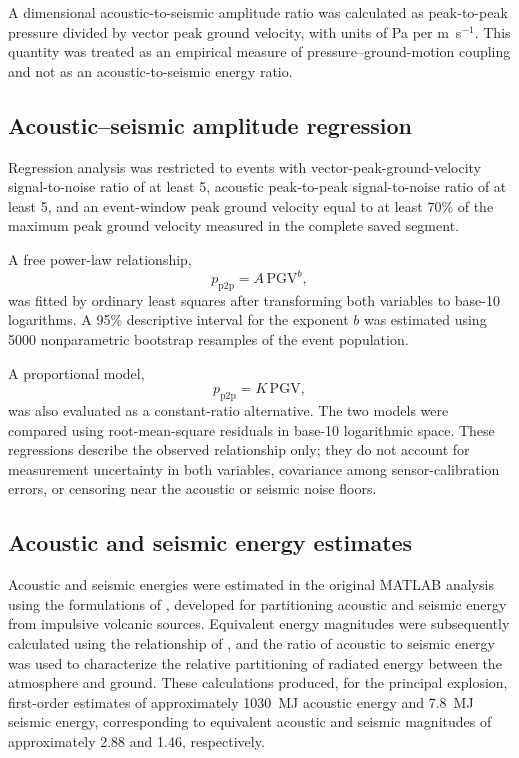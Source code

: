 \documentclass[]{seismica}
\begin{document}
A dimensional acoustic-to-seismic amplitude ratio was calculated as peak-to-peak pressure divided by vector peak ground velocity, with units of Pa per m~s$^{-1}$. This quantity was treated as an empirical measure of pressure--ground-motion coupling and not as an acoustic-to-seismic energy ratio.

\subsection{Acoustic--seismic amplitude regression}

Regression analysis was restricted to events with vector-peak-ground-velocity signal-to-noise ratio of at least 5, acoustic peak-to-peak signal-to-noise ratio of at least 5, and an event-window peak ground velocity equal to at least 70\% of the maximum peak ground velocity measured in the complete saved segment.

A free power-law relationship,
\begin{equation}
  p_{\mathrm{p2p}} = A\,\mathrm{PGV}^{b},
  \label{eq:power_law}
\end{equation}
was fitted by ordinary least squares after transforming both variables to base-10 logarithms. A 95\% descriptive interval for the exponent $b$ was estimated using 5000 nonparametric bootstrap resamples of the event population.

A proportional model,
\begin{equation}
  p_{\mathrm{p2p}} = K\,\mathrm{PGV},
  \label{eq:proportional_model}
\end{equation}
was also evaluated as a constant-ratio alternative. The two models were compared using root-mean-square residuals in base-10 logarithmic space. These regressions describe the observed relationship only; they do not account for measurement uncertainty in both variables, covariance among sensor-calibration errors, or censoring near the acoustic or seismic noise floors.

\subsection{Acoustic and seismic energy estimates}

Acoustic and seismic energies were estimated in the original MATLAB analysis using the formulations of \citet{johnson_aster_2005}, developed for partitioning acoustic and seismic energy from impulsive volcanic sources. Equivalent energy magnitudes were subsequently calculated using the relationship of \citet{kanamori_1977}, and the ratio of acoustic to seismic energy was used to characterize the relative partitioning of radiated energy between the atmosphere and ground. These calculations produced, for the principal explosion, first-order estimates of approximately 1030~MJ acoustic energy and 7.8~MJ seismic energy, corresponding to equivalent acoustic and seismic magnitudes of approximately 2.88 and 1.46, respectively.
\end{document}
